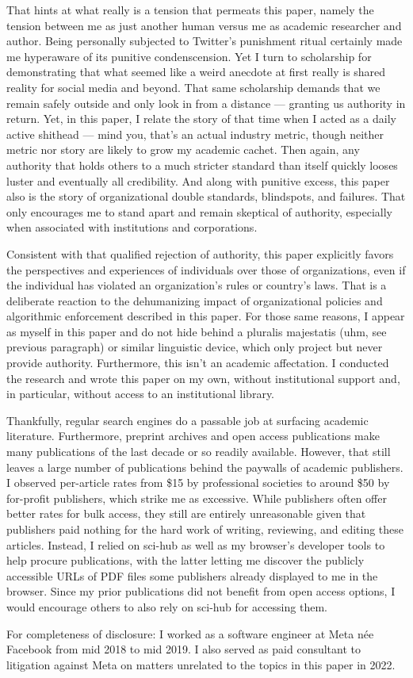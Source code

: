 That hints at what really is a tension that permeats this paper, namely the
tension between me as just another human versus me as academic researcher and
author. Being personally subjected to Twitter's punishment ritual certainly made
me hyperaware of its punitive condenscension. Yet I turn to scholarship for
demonstrating that what seemed like a weird anecdote at first really is shared
reality for social media and beyond. That same scholarship demands that we
remain safely outside and only look in from a distance --- granting us authority
in return. Yet, in this paper, I relate the story of that time when I acted as a
daily active shithead --- mind you, that's an actual industry metric, though
neither metric nor story are likely to grow my academic cachet. Then again, any
authority that holds others to a much stricter standard than itself quickly
looses luster and eventually all credibility. And along with punitive excess,
this paper also is the story of organizational double standards, blindspots, and
failures. That only encourages me to stand apart and remain skeptical of
authority, especially when associated with institutions and corporations.

Consistent with that qualified rejection of authority, this paper explicitly
favors the perspectives and experiences of individuals over those of
organizations, even if the individual has violated an organization's rules or
country's laws. That is a deliberate reaction to the dehumanizing impact of
organizational policies and algorithmic enforcement described in this paper. For
those same reasons, I appear as myself in this paper and do not hide behind a
pluralis majestatis (uhm, see previous paragraph) or similar linguistic device,
which only project but never provide authority. Furthermore, this isn't an
academic affectation. I conducted the research and wrote this paper on my own,
without institutional support and, in particular, without access to an
institutional library.

Thankfully, regular search engines do a passable job at surfacing academic
literature. Furthermore, preprint archives and open access publications make
many publications of the last decade or so readily available. However, that
still leaves a large number of publications behind the paywalls of academic
publishers. I observed per-article rates from \$15 by professional societies to
around \$50 by for-profit publishers, which strike me as excessive. While
publishers often offer better rates for bulk access, they still are entirely
unreasonable given that publishers paid nothing for the hard work of writing,
reviewing, and editing these articles. Instead, I relied on sci-hub as well as
my browser's developer tools to help procure publications, with the latter
letting me discover the publicly accessible URLs of PDF files some publishers
already displayed to me in the browser. Since my prior publications did not
benefit from open access options, I would encourage others to also rely on
sci-hub for accessing them.

For completeness of disclosure: I worked as a software engineer at Meta n\'ee
Facebook from mid 2018 to mid 2019. I also served as paid consultant to
litigation against Meta on matters unrelated to the topics in this paper in
2022.
